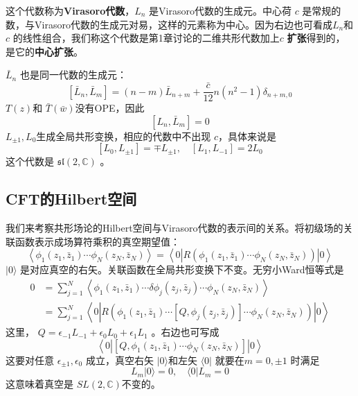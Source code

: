 这个代数称为\textbf{Virasoro代数}，$ L_n$ 是Virasoro代数的生成元。中心荷 $c$ 是常规的数，与Virasoro代数的生成元对易，这样的元素称为中心。因为右边也可看成$ L_n $和 $c$ 的线性组合，我们称这个代数是第1章讨论的二维共形代数加上$ c$ \textbf{扩张}得到的，是它的\textbf{中心扩张}。

$\bar{L}_n$ 也是同一代数的生成元：
\begin{equation}	
\left[\bar{L}_{n}, \bar{L}_{m}\right]=(n-m) \bar{L}_{n+m}+\frac{\bar{c}}{12} n\left(n^{2}-1\right) \delta_{n+m, 0}
\end{equation}
$T(z) $和 $\bar{T}(\bar{w}) $没有OPE，因此
\begin{equation}
\left[L_{n}, \bar{L}_{m}\right]=0	
\end{equation}
$L_{\pm 1},L_0 $生成全局共形变换，相应的代数中不出现 $c $，具体来说是
\begin{equation}
\left[L_{0}, L_{\pm 1}\right]=\mp L_{\pm 1}, \quad\left[L_{1}, L_{-1}\right]=2 L_{0}
\end{equation}
这个代数是 $\mathfrak{sl}(2,\mathbb{C})$ 。

\subsection{CFT的Hilbert空间}
我们来考察共形场论的Hilbert空间与Virasoro代数的表示间的关系。将初级场的关联函数表示成场算符乘积的真空期望值：
\begin{equation}
	\left\langle\phi_{1}\left(z_{1}, \bar{z}_{1}\right) \cdots \phi_{N}\left(z_{N}, \bar{z}_{N}\right)\right\rangle=\left\langle 0\left|R\left(\phi_{1}\left(z_{1}, \bar{z}_{1}\right) \cdots \phi_{N}\left(z_{N}, \bar{z}_{N}\right)\right)\right| 0\right\rangle
\end{equation}
$|0\rangle$ 是对应真空的右矢。关联函数在全局共形变换下不变。无穷小Ward恒等式是
\begin{equation}
	\begin{aligned} 0 &=\sum_{j=1}^{N}\left\langle\phi_{1}\left(z_{1}, \bar{z}_{1}\right) \cdots \delta \phi_{j}\left(z_{j}, \bar{z}_{j}\right) \cdots \phi_{N}\left(z_{N}, \bar{z}_{N}\right)\right\rangle \\ &=\sum_{j=1}^{N}\left\langle 0\left|R\left(\phi_{1}\left(z_{1}, \bar{z}_{1}\right) \cdots\left[Q, \phi_{j}\left(z_{j}, \bar{z}_{j}\right)\right] \cdots \phi_{N}\left(z_{N}, \bar{z}_{N}\right)\right)\right| 0\right\rangle \end{aligned}
\end{equation}
这里， $Q=\epsilon_{-1} L_{-1}+\epsilon_{0} L_{0}+\epsilon_{1} L_{1}$ 。右边也可写成
\[
	\left\langle 0\left|\left[Q, \phi_{1}\left(z_{1}, \bar{z}_{1}\right) \cdots \phi_{N}\left(z_{N}, \bar{z}_{N}\right)\right]\right| 0\right\rangle
\]
这要对任意 $\epsilon_{\pm1},\epsilon_0$ 成立，真空右矢 $|0\rangle $和左矢 $\langle 0|$ 就要在$ m=0,\pm 1$ 时满足
\begin{equation}
	L_{m}|0\rangle=0, \quad\langle 0| L_{m}=0
\end{equation}
这意味着真空是 $SL(2,\mathbb{C}) $不变的。

